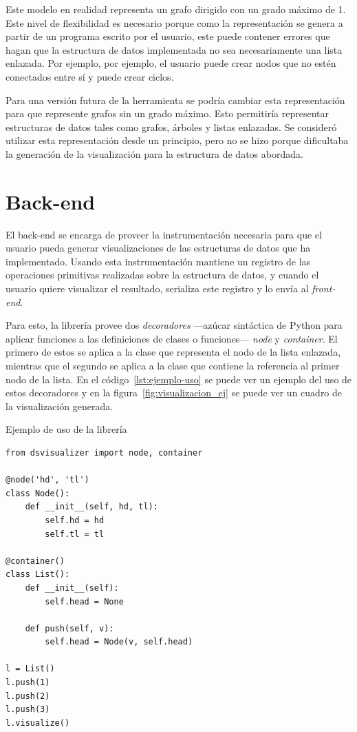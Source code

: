 Este modelo en realidad representa un grafo dirigido con un grado máximo de 1. Este nivel de flexibilidad es necesario porque como la representación se genera a partir de un programa escrito por el usuario, este puede contener errores que hagan que la estructura de datos implementada no sea necesariamente una lista enlazada. Por ejemplo, por ejemplo, el usuario puede crear nodos que no estén conectados entre sí y puede crear ciclos.

Para una versión futura de la herramienta se podría cambiar esta representación para que represente grafos sin un grado máximo. Esto permitiría representar estructuras de datos tales como grafos, árboles y listas enlazadas. Se consideró utilizar esta representación desde un principio, pero no se hizo porque dificultaba la generación de la visualización para la estructura de datos abordada.

\section{Back-end}

El back-end se encarga de proveer la instrumentación necesaria para que el usuario pueda generar visualizaciones de las estructuras de datos que ha implementado. Usando esta instrumentación mantiene un registro de las operaciones primitivas realizadas sobre la estructura de datos, y cuando el usuario quiere visualizar el resultado, serializa este registro y lo envía al \textit{front-end}.

Para esto, la librería provee dos \textit{decoradores} ---azúcar sintáctica de Python para aplicar funciones a las definiciones de clases o funciones--- \textit{node} y \textit{container}. El primero de estos se aplica a la clase que representa el nodo de la lista enlazada, mientras que el segundo se aplica a la clase que contiene la referencia al primer nodo de la lista. En el código~\ref{lst:ejemplo-uso} se puede ver un ejemplo del uso de estos decoradores y en la figura~\ref{fig:visualizacion_ej} se puede ver un cuadro de la visualización generada.

\begin{listing}[h!]
\caption{Ejemplo de uso de la librería}
\label{lst:ejemplo-uso}
\begin{verbatim}
from dsvisualizer import node, container

@node('hd', 'tl')
class Node():
    def __init__(self, hd, tl):
        self.hd = hd
        self.tl = tl

@container()
class List():
    def __init__(self):
        self.head = None

    def push(self, v):
        self.head = Node(v, self.head)

l = List()
l.push(1)
l.push(2)
l.push(3)
l.visualize()
\end{verbatim}
\end{listing}

